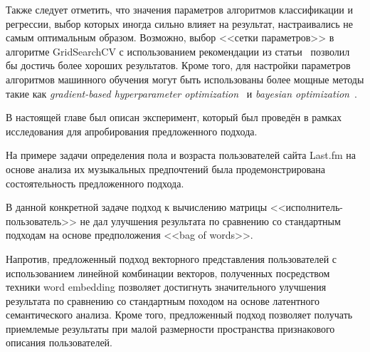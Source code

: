 Также следует отметить, что значения параметров алгоритмов классификации и
регрессии, выбор которых иногда сильно влияет на результат, настраивались
не самым оптимальным образом. Возможно, выбор <<сетки параметров>> в
алгоритме GridSearchCV с использованием рекомендации из
статьи~\cite{hsu2003practical} позволил бы достичь более хороших результатов.
Кроме того, для настройки параметров алгоритмов машинного обучения
могут быть использованы более мощные методы такие как 
\textit{gradient-based hyperparameter optimization}~\cite{maclaurin2015gradient}
и \textit{bayesian optimization}~\cite{hutter2011sequential}.


\chapterconclusion

В настоящей главе был описан эксперимент, который был проведён
в рамках исследования для апробирования предложенного подхода.

На примере задачи определения пола и
возраста пользователей сайта Last.fm на основе анализа их
музыкальных предпочтений была продемонстрирована
состоятельность предложенного подхода.

В данной конкретной задаче подход к вычислению матрицы
<<исполнитель-пользователь>> не дал улучшения результата по
сравнению со стандартным подходам на основе предположения
<<bag of words>>.

Напротив, предложенный подход векторного представления пользователей
с использованием линейной комбинации векторов, полученных
посредством техники word embedding позволяет достигнуть
значительного улучшения результата по сравнению со стандартным
походом на основе латентного семантического анализа. Кроме того,
предложенный подход позволяет получать приемлемые результаты
при малой размерности пространства признакового описания пользователей.

